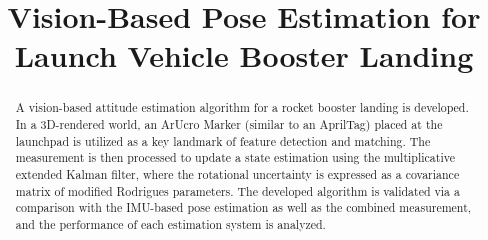 \documentclass[conference]{IEEEtran}
\begin{document}
\title{Vision-Based Pose Estimation for Launch Vehicle Booster Landing\\
}

\author{
\and
{}
\and
{}
\and
{}
}

\maketitle

\begin{abstract}
A vision-based attitude estimation algorithm for a rocket booster landing is developed. 
In a 3D-rendered world, an ArUcro Marker (similar to an AprilTag) placed at the launchpad is utilized as a key landmark of feature detection and matching. 
The measurement is then processed to update a state estimation using the multiplicative extended Kalman filter, where the rotational uncertainty is expressed as a covariance matrix of modified Rodrigues parameters. 
The developed algorithm is validated via a comparison with the IMU-based pose estimation as well as the combined measurement, and the performance of each estimation system is analyzed.  
\end{abstract}

\end{document}
